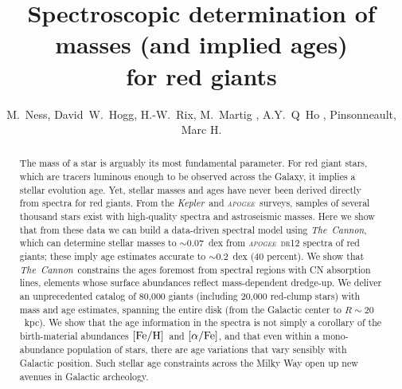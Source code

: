 \documentclass[12pt, preprint]{aastex}
\newcommand{\project}[1]{\textsl{#1}}
\newcommand{\tc}{\project{The~Cannon}}
\newcommand{\apogee}{\project{\textsc{apogee}}}
\newcommand{\kepler}{\project{Kepler}}
\newcommand{\feh}{\mbox{$\rm [Fe/H]$}}
\newcommand{\alphafe}{\mbox{$\rm [\alpha/Fe]$}}
\begin{document}
\title{Spectroscopic determination of masses (and implied ages) \\for red giants}
\author{M.~Ness,
        David~W.~Hogg,
        H.-W.~Rix,
        M.~Martig , 
        A.Y.~Q~Ho ,
        Pinsonneault, Marc H. }

\begin{abstract}%
The mass of a star is arguably its most fundamental parameter.
For red giant stars, which are tracers luminous enough to be observed
across the Galaxy, it implies a stellar evolution age.
Yet, stellar masses and ages have never been derived directly from
spectra for red giants.
From the \kepler\ and \apogee\ surveys, samples of several thousand
stars exist with high-quality spectra and astroseismic masses.
Here we show that from these data we can build a data-driven spectral
model using \tc, which can determine stellar masses to $\sim 0.07$~dex
from \apogee\ \textsc{dr12} spectra of red giants; these imply age
estimates accurate to $\sim 0.2$~dex (40 percent).
We show that \tc\ constrains the ages foremost from spectral regions
with CN absorption lines, elements whose surface abundances reflect
mass-dependent dredge-up.
We deliver an unprecedented catalog of 80,000 giants (including 20,000
red-clump stars) with mass and age estimates, spanning the entire disk
(from the Galactic center to $R\sim 20$~kpc).
We show that the age information in the spectra is not simply a
corollary of the birth-material abundances \feh\ and \alphafe, and
that even within a mono-abundance population of stars, there are age
variations that vary sensibly with Galactic position.
Such stellar age constraints across the Milky Way open up new avenues
in Galactic archeology.
\end{abstract}
\end{document}

